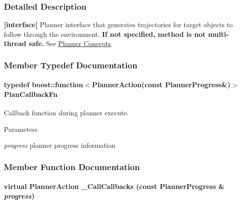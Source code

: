 \subsubsection{Detailed Description}
{\bfseries \mbox{[}interface\mbox{]}} Planner interface that generates trajectories for target objects to follow through the environment. {\bfseries If not specified, method is not multi-\/thread safe.} See \hyperlink{arch__planner}{Planner Concepts}. 

\subsubsection{Member Typedef Documentation}
\hypertarget{classOpenRAVE_1_1PlannerBase_af66cf367615e6c51bab4473f4fcf1018}{
\paragraph[{PlanCallbackFn}]{\setlength{\rightskip}{0pt plus 5cm}typedef boost::function$<${\bf PlannerAction}(const {\bf PlannerProgress}\&)$>$ {\bf PlanCallbackFn}}\hfill}
\label{classOpenRAVE_1_1PlannerBase_af66cf367615e6c51bab4473f4fcf1018}


Callback function during planner execute. 


\begin{DoxyParams}{Parameters}
\item[{\em progress}]planner progress information \end{DoxyParams}


\subsubsection{Member Function Documentation}
\hypertarget{classOpenRAVE_1_1PlannerBase_a4b980a3cc0e8fc7abd2d0afe472ef695}{
\paragraph[{\_\-CallCallbacks}]{\setlength{\rightskip}{0pt plus 5cm}virtual {\bf PlannerAction} \_\-CallCallbacks (const {\bf PlannerProgress} \& {\em progress})}\hfill}
\label{classOpenRAVE_1_1PlannerBase_a4b980a3cc0e8fc7abd2d0afe472ef695}


